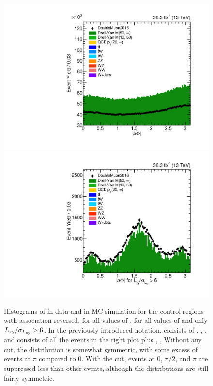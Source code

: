 \begin{figure}[t]
  \centering
  \includegraphics[width=\DSquareWidth]{figures/displaced/BGEST_NOPAT_deltaPhi_Lin.pdf}
  \hspace*{-2em}
  \includegraphics[width=\DSquareWidth]{figures/displaced/BGEST_NOPAT_deltaPhi-Big_Lin.pdf}
  \caption[Histograms of \DeltaPhi in data and in MC simulation for the control regions with \DSAToPAT association reversed, for all values of \DeltaPhi, for all values of \LxySig and for $\LxySig > 6$.]{Histograms of \DeltaPhi in data and in MC simulation for the control regions with \DSAToPAT association reversed, for all values of \DeltaPhi, for  all values of \LxySig and  only $\LxySig > 6$. In the previously introduced notation,  consists of , , \etc, and  consists of all the events in the right plot plus , , \etc Without any \LxySig cut, the distribution is somewhat symmetric, with some excess of events at $\pi$ compared to 0. With the \LxySig cut, events at 0, $\pi/2$, and $\pi$ are suppressed less than other events, although the distributions are still fairly symmetric.}
  \label{fig:dd:BGDeltaPhi_NoPAT}
\end{figure}

